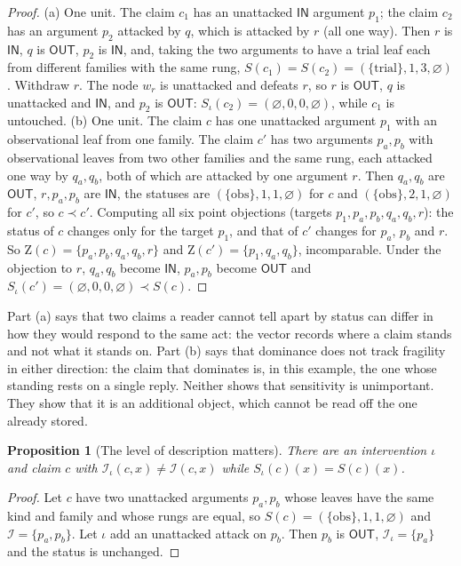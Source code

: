 \documentclass[11pt]{article}
\theoremstyle{plain}
\newtheorem{proposition}[theorem]{Proposition}
\theoremstyle{definition}
\theoremstyle{remark}
\newcommand{\IN}{\textsf{IN}}
\newcommand{\OUT}{\textsf{OUT}}
\newcommand{\Zs}{\mathrm{Z}}
\begin{document}
\begin{proof}
(a) One unit. The claim $c_1$ has an unattacked $\IN$ argument $p_1$; the claim $c_2$ has an argument $p_2$ attacked by $q$, which is attacked by $r$ (all one way). Then $r$ is $\IN$, $q$ is $\OUT$, $p_2$ is $\IN$, and, taking the two arguments to have a trial leaf each from different families with the same rung, $S(c_1)=S(c_2)=(\{\text{trial}\},1,3,\varnothing)$. Withdraw $r$. The node $w_r$ is unattacked and defeats $r$, so $r$ is $\OUT$, $q$ is unattacked and $\IN$, and $p_2$ is $\OUT$: $S_\iota(c_2)=(\varnothing,0,0,\varnothing)$, while $c_1$ is untouched.
(b) One unit. The claim $c$ has one unattacked argument $p_1$ with an observational leaf from one family. The claim $c'$ has two arguments $p_a,p_b$ with observational leaves from two other families and the same rung, each attacked one way by $q_a,q_b$, both of which are attacked by one argument $r$. Then $q_a,q_b$ are $\OUT$, $r,p_a,p_b$ are $\IN$, the statuses are $(\{\text{obs}\},1,1,\varnothing)$ for $c$ and $(\{\text{obs}\},2,1,\varnothing)$ for $c'$, so $c\prec c'$. Computing all six point objections (targets $p_1,p_a,p_b,q_a,q_b,r$): the status of $c$ changes only for the target $p_1$, and that of $c'$ changes for $p_a$, $p_b$ and $r$. So $\Zs(c)=\{p_a,p_b,q_a,q_b,r\}$ and $\Zs(c')=\{p_1,q_a,q_b\}$, incomparable. Under the objection to $r$, $q_a,q_b$ become $\IN$, $p_a,p_b$ become $\OUT$ and $S_\iota(c')=(\varnothing,0,0,\varnothing)\prec S(c)$. \qedhere
\end{proof}

Part (a) says that two claims a reader cannot tell apart by status can differ in how they would respond to the same act: the vector records where a claim stands and not what it stands on. Part (b) says that dominance does not track fragility in either direction: the claim that dominates is, in this example, the one whose standing rests on a single reply. Neither shows that sensitivity is unimportant. They show that it is an additional object, which cannot be read off the one already stored.

\begin{proposition}[The level of description matters]\label{prop:coarse}
There are an intervention $\iota$ and claim $c$ with $\mathcal I_\iota(c,x)\ne\mathcal I(c,x)$ while $S_\iota(c)(x)=S(c)(x)$.
\end{proposition}

\begin{proof}
Let $c$ have two unattacked arguments $p_a,p_b$ whose leaves have the same kind and family and whose rungs are equal, so $S(c)=(\{\text{obs}\},1,1,\varnothing)$ and $\mathcal I=\{p_a,p_b\}$. Let $\iota$ add an unattacked attack on $p_b$. Then $p_b$ is $\OUT$, $\mathcal I_\iota=\{p_a\}$ and the status is unchanged. \qedhere
\end{proof}
\end{document}
